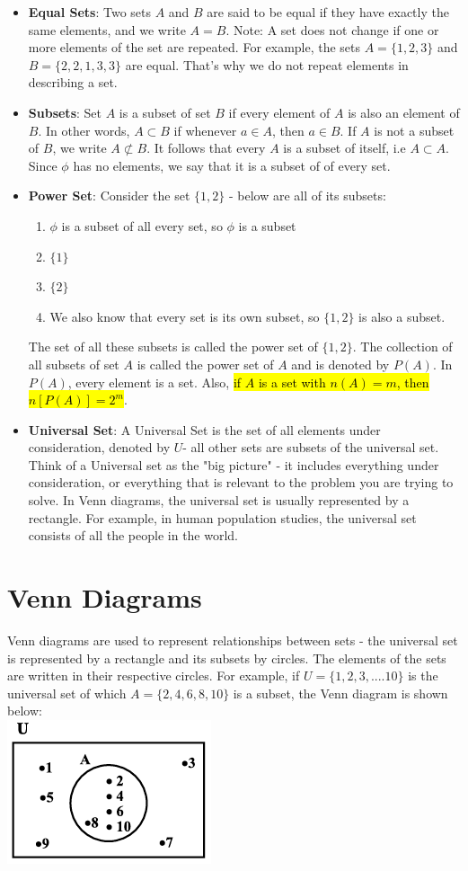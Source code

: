 \documentclass{book}
\begin{document}
\begin{itemize}
		\item \textbf{Equal Sets}: Two sets $A$ and $B$ are said to be equal if they have exactly the same elements, and we write $A=B$. Note: A set does not change if  one or more elements of the set are repeated. For example, the sets $A=\{1,2,3\}$ and $B=\{2,2,1,3,3\}$ are equal. That's why we do not repeat elements in describing a set.
		\item \textbf{Subsets}: Set $A$ is a subset of set $B$ if every element of $A$ is also an element of $B$. In other words, $A \subset B$ if whenever $a \in A$, then $a \in B$. If $A$ is not a subset of $B$, we write $A \not\subset B$. It follows that every $A$ is a subset of itself, i.e $A \subset A$. Since $\phi$ has no elements, we say that it is a subset of of every set.
		\item \textbf{Power Set}: Consider the set $\{1,2\}$ - below are all of its subsets:
		\begin{enumerate}
			\item $\phi$ is a subset of all every set, so $\phi$ is a subset
			\item $\{1\}$
			\item $\{2\}$
			\item We also know that every set is its own subset, so $\{1,2\}$ is also a subset.
		\end{enumerate}
		The set of all these subsets is called the power set of $\{1,2\}$. The collection of all subsets of set $A$ is called the power set of $A$ and is denoted by $P(A)$. In $P(A)$, every element is a set. Also, \hl{if $A$ is a set with $n(A) =m$, then $n[P(A)]=2^m$}.
		\item \textbf{Universal Set}: A Universal Set is the set of all elements under consideration, denoted by $U$- all other sets are subsets of the universal set. Think of a Universal set as the "big picture" - it includes everything under consideration, or everything that is relevant to the problem you are trying to solve. In Venn diagrams, the universal set is usually represented by a rectangle. For example, in human population studies, the universal set consists of all the people in the world.
		\end{itemize}
		\section{Venn Diagrams}
		Venn diagrams are used to represent relationships between sets - the universal set is represented by a rectangle and its subsets by circles. The elements of the sets are written in their respective circles. For example, if $U = \{1,2,3,....10\}$ is the universal set of which $A=\{2,4,6,8,10\}$ is a subset, the Venn diagram is shown below: \\
		\includegraphics[scale=0.8]{set1}
		
\end{document}
